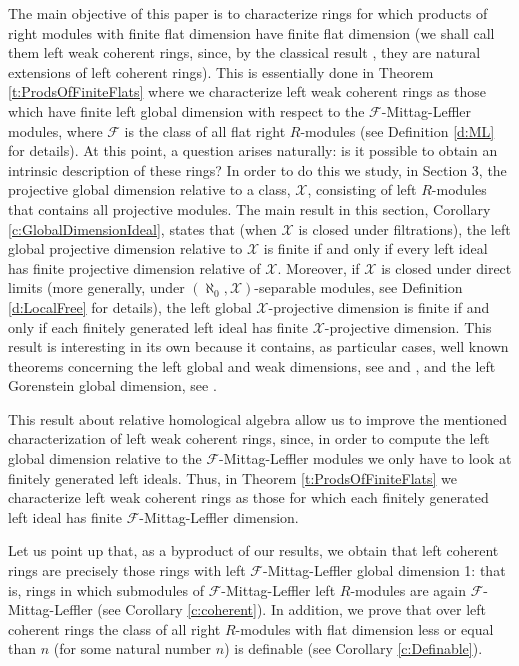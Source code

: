 \documentclass[a4paper,10pt]{amsart}
\begin{document}
The main objective of this paper is to characterize rings for which
products of right modules with finite flat dimension have finite flat
dimension (we shall call them left weak coherent rings, since, by the
classical result \cite[Theorem 2.1]{chase}, they are natural
extensions of left coherent rings). This is essentially done in
Theorem \ref{t:ProdsOfFiniteFlats} where we characterize left weak
coherent rings as those which have finite left global dimension with
respect to the $\mathcal F$-Mittag-Leffler modules, where $\mathcal F$
is the class of all flat right $R$-modules (see Definition \ref{d:ML}
for details). At this point, a question arises naturally: is it
possible to obtain an intrinsic description of these rings? In order
to do this we study, in Section 3, the projective global dimension
relative to a class, $\mathcal X$, consisting of left $R$-modules that
contains all projective modules. The main result in this section,
Corollary \ref{c:GlobalDimensionIdeal}, states that (when $\mathcal X$
is closed under filtrations), the left global
projective dimension relative to $\mathcal X$ is finite if and only if
every left ideal has finite projective dimension relative of $\mathcal
X$. Moreover, if $\mathcal X$ is closed under direct limits (more
generally, under $(\aleph_0,\mathcal X)$-separable modules, see
Definition \ref{d:LocalFree} for details), the left global $\mathcal
X$-projective dimension is finite if and only if each finitely
generated left ideal has finite $\mathcal X$-projective
dimension. This result is interesting in its own because it contains,
as particular cases, well known theorems concerning the left global and weak
dimensions, see \cite[Theorem 1]{Auslander} and \cite[Theorem
8.25]{Rotman}, and the left Gorenstein global dimension, see
\cite[Proposition 3.5]{EnochsIacobJenda}.

This result about relative homological algebra allow us to improve the mentioned
characterization of left weak coherent rings, since, in order to compute the left global
dimension relative to the $\mathcal F$-Mittag-Leffler modules we only
have to look at finitely generated left ideals. Thus, in Theorem
\ref{t:ProdsOfFiniteFlats} we characterize left weak coherent rings
as those for which each finitely generated left ideal has finite
$\mathcal F$-Mittag-Leffler dimension. 

Let us point up that, as a byproduct of our
results, we obtain that left coherent rings are precisely those rings
with left $\mathcal F$-Mittag-Leffler global dimension 1: that is,
rings in which submodules of $\mathcal F$-Mittag-Leffler left
$R$-modules are again $\mathcal F$-Mittag-Leffler (see Corollary
\ref{c:coherent}). In addition, we prove that over left coherent rings
the class of all right $R$-modules with flat dimension less or equal than $n$
(for some natural number $n$) is definable (see Corollary
\ref{c:Definable}).
\end{document}
